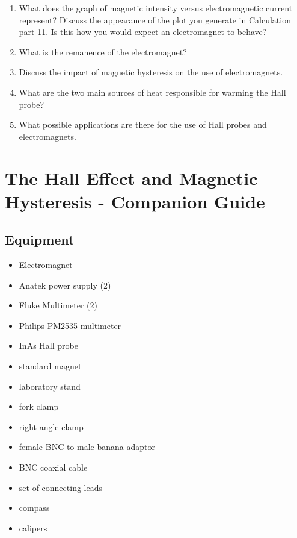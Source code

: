 \begin{enumerate}[resume]
\item What does the graph of magnetic intensity versus electromagnetic current represent? Discuss the appearance of the plot you generate in Calculation part 11. Is this how you would expect an electromagnet to behave?

\item What is the remanence of the electromagnet? 

\item Discuss the impact of magnetic hysteresis on the use of electromagnets.

\item What are the two main sources of heat responsible for warming the Hall probe? 

\item What possible applications are there for the use of Hall probes and electromagnets.

\end{enumerate}


\AtEndDocument{\clearpage\ifodd\value{page}\else\null\clearpage\fi} %


\chapter{The Hall Effect and Magnetic Hysteresis - Companion Guide}

\section{Equipment}
\begin{minipage}[t]{0.5\textwidth}
\begin{itemize}[noitemsep]
\item Electromagnet
\item Anatek power supply (2)
\item Fluke Multimeter (2)  %
\item Philips PM2535 multimeter
\item InAs Hall probe
\item standard magnet
\item laboratory stand
\item fork clamp
\end{itemize}
\end{minipage}
\begin{minipage}[t]{0.5\textwidth}
\begin{itemize}[noitemsep]
\item right angle clamp
\item female BNC to male banana adaptor
\item BNC coaxial cable
\item set of connecting leads
\item compass
\item calipers
\end{itemize}
\end{minipage}

